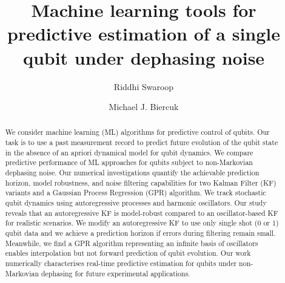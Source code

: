 \title{Machine learning tools for predictive estimation of a single qubit under dephasing noise}

\author{Riddhi Swaroop} 

\author{Michael J. Biercuk}

\begin{abstract}
We consider machine learning (ML) algorithms for predictive control of qubits. Our task is to use a past measurement record to predict future evolution of the qubit state in the absence of an apriori dynamical model for qubit dynamics. We compare predictive performance of ML approaches for qubits subject to non-Markovian dephasing noise. Our numerical investigations quantify the achievable prediction horizon, model robustness, and noise filtering capabilities for two Kalman Filter (KF) variants and a Gaussian Process Regression (GPR) algorithm. We track stochastic qubit dynamics using autoregressive processes and harmonic oscillators. Our study reveals that an autoregressive KF is model-robust compared to an oscillator-based KF for realistic scenarios. We modify an autoregressive KF to use only single shot (0 or 1) qubit data and we achieve a prediction horizon if errors during filtering remain small. Meanwhile, we find a GPR algorithm representing an infinite basis of oscillators enables interpolation but not forward prediction of qubit evolution. Our work numerically characterises real-time predictive estimation for qubits under non-Markovian dephasing for future experimental applications.
\end{abstract}

\maketitle